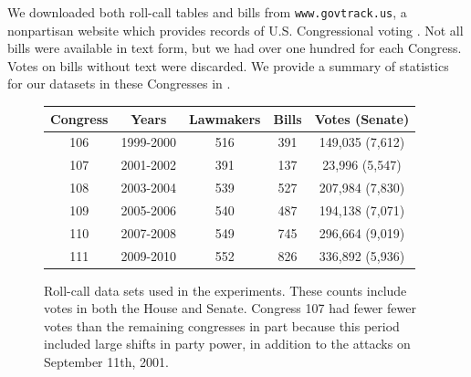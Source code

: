 We downloaded both roll-call tables and bills from
\verb!www.govtrack.us!, a nonpartisan website
which provides records of U.S. Congressional voting \citep{govtrack:2009}.  Not all bills
were available in text form, but we had over one hundred for each
Congress.  Votes on bills without text were discarded.  We provide a
summary of statistics for our datasets in these Congresses in
.

\begin{figure}
  \center
  \caption{Roll-call data sets used in the experiments.  These counts
    include votes in both the House and Senate.  Congress 107 had
    fewer fewer votes than the remaining congresses in part because
    this period included large shifts in party power, in addition to
    the attacks on September 11th, 2001.}
  \begin{small}
  \begin{tabular}{|cc|ccc|}
    \hline
    \hspace{-8pt} \textbf{Congress} \hspace{-8pt} & \hspace{-8pt} {\textbf{Years}} \hspace{-8pt} & \textbf{Lawmakers} \hspace{-8pt} & \hspace{-4pt} \textbf{Bills} \hspace{-4pt} & \hspace{-4pt} \textbf{Votes} (Senate) \\
    \hline
    106 & 1999-2000 & 516 & 391 & 149,035 (7,612) \\
    107 & 2001-2002 & 391 & 137 & 23,996 (5,547) \\
    108 & 2003-2004 & 539 & 527 & 207,984 (7,830) \\
    109 & 2005-2006 & 540 & 487 & 194,138 (7,071) \\
    110 & 2007-2008 & 549 & 745 & 296,664 (9,019) \\
    111 & 2009-2010 & 552 & 826 & 336,892 (5,936) \\
    \hline
  \end{tabular}
  \end{small}
  \label{fig:data_stats}
\end{figure}


